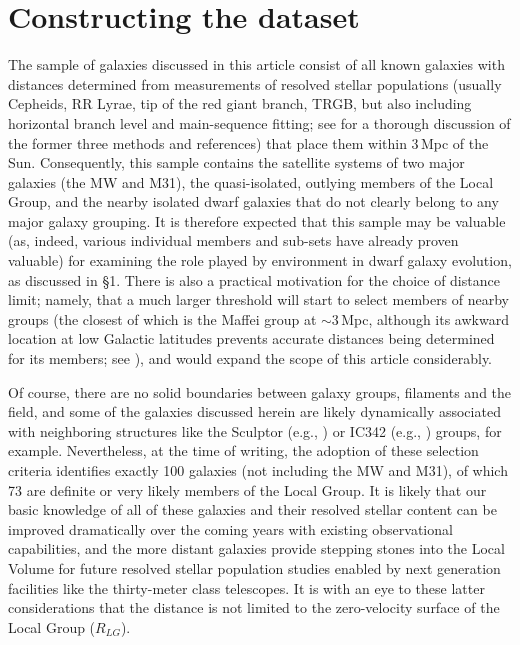 \documentclass[manuscript]{aastex}
\begin{document}
\section{Constructing the dataset}

The sample of galaxies discussed in this article consist of all known
galaxies with distances determined from measurements of resolved
stellar populations (usually Cepheids, RR Lyrae, tip of the red giant
branch, TRGB, but also including horizontal branch level and
main-sequence fitting; see \citealt{tammann2008} for a thorough
discussion of the former three methods and
references) that place them within 3\,Mpc of the Sun.  Consequently,
this sample contains the satellite systems of two major galaxies (the
MW and M31), the quasi-isolated, outlying members of the Local Group,
and the nearby isolated dwarf galaxies that do not clearly belong to
any major galaxy grouping. It is therefore expected that this sample
may be valuable (as, indeed, various individual members and sub-sets
have already proven valuable) for examining the role played by
environment in dwarf galaxy evolution, as discussed in \S1. There is
also a practical motivation for the choice of distance limit; namely,
that a much larger threshold will start to select members of nearby
groups (the closest of which is the Maffei group at $\sim 3$\,Mpc,
although its awkward location at low Galactic latitudes prevents
accurate distances being determined for its members; see
\citealt{fingerhut2007}), and would expand the scope of this article
considerably.

Of course, there are no solid boundaries between galaxy groups,
filaments and the field, and some of the galaxies discussed herein are
likely dynamically associated with neighboring structures like the
Sculptor (e.g., \citealt{karachentsev2003a}) or IC342 (e.g.,
\citealt{karachentsev2003b}) groups, for example. Nevertheless, at the
time of writing, the adoption of these selection criteria identifies
exactly 100 galaxies (not including the MW and M31), of which 73 are
definite or very likely members of the Local Group. It is likely
that our basic knowledge of all of these galaxies and their resolved
stellar content can be improved
dramatically over the coming years with existing observational
capabilities, and the more distant galaxies provide stepping stones
into the Local Volume for future resolved stellar population studies
enabled by next generation facilities like the thirty-meter class
telescopes. It is with an eye to these latter considerations that the
distance is not limited to the zero-velocity surface of the Local
Group ($R_{LG}$).
\end{document}
